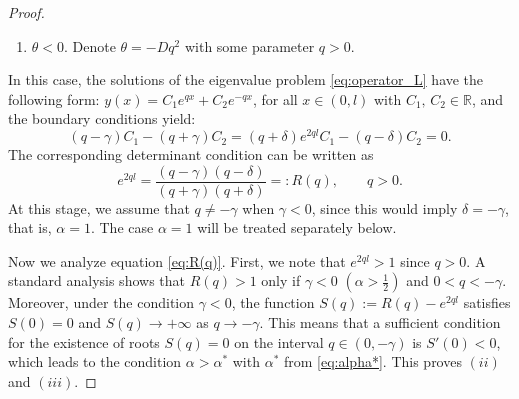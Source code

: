 \documentclass[10pt,a4paper]{amsart}
\begin{document}
\begin{proof}
\begin{enumerate}
    \item[2)] $\theta<0$. Denote $\theta=-Dq^2$ with some parameter $q>0$.
\end{enumerate}
 In this case, the solutions of the eigenvalue problem \eqref{eq:operator_L} have the following form: 
$
y(x)=C_1e^{qx}+C_2e^{-qx}$, for all 
$x \in (0,l)$ with $C_1,\,C_2\in\mathbb{R}$,
and the boundary conditions yield:
\begin{equation}\label{eq:BC_nu<0}
(q-\gamma)C_1-(q+\gamma)C_2= 
(q+\delta)e^{2ql}C_1-(q-\delta)C_2=0.
\end{equation}
The corresponding determinant condition can be written as
\begin{equation}\label{eq:R(q)}
e^{2ql}=\frac{(q-\gamma)(q-\delta)}{(q+\gamma)(q+\delta)}=:R(q), \qquad q>0.
\end{equation}
At this stage, we assume that $q\neq -\gamma$ when $\gamma<0$, since this would imply
$\delta=-\gamma$, that is, $\alpha=1$. The case $\alpha=1$ will be treated separately below.

Now we analyze equation \eqref{eq:R(q)}. First, we note that $e^{2ql}>1$ since $q>0$. A standard analysis shows that $R(q)>1$ only if $\gamma<0$ $\left(\alpha>\frac{1}{2}\right)$ and $0<q<-\gamma$. Moreover, under the condition $\gamma<0$, the function $S(q):=R(q)-e^{2ql}$ satisfies $S(0)=0$ and $S(q)\to+\infty$ as $q\to-\gamma$. This means that a sufficient condition for the existence of roots $S(q)=0$ on the interval $q\in(0,-\gamma)$ is $S'(0)<0$, which leads to the condition $\alpha>\alpha^*$ with $\alpha^*$ from \eqref{eq:alpha*}.
%
%
This proves $(ii)$ and $(iii)$.


\end{proof}
\end{document}
